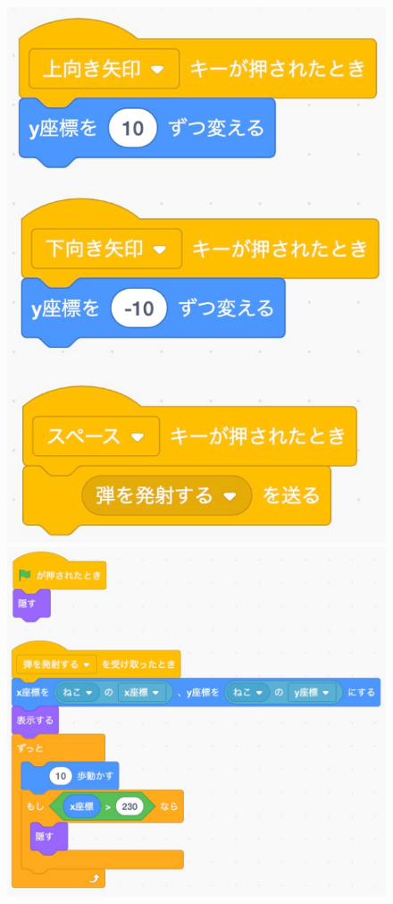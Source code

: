 \documentclass[10pt,a4j]{ltjsarticle}
\begin{document}
\begin{figure}[H]
  \begin{minipage}[b]{0.5\linewidth}
    \centering
    \includegraphics[keepaspectratio, scale=0.4]{images/sample03-1.pdf}
  \end{minipage}
  \begin{minipage}[b]{0.5\linewidth}
    \centering
    \includegraphics[keepaspectratio, scale=0.4]{images/sample03-2.pdf}

\end{minipage}
\end{figure}
\end{document}
